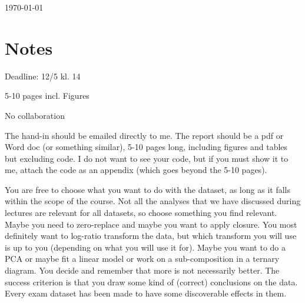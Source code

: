 \documentclass{article}
\begin{document}
\today
\tableofcontents

























\newpage{}

\section{Notes}

Deadline: 12/5 kl. 14

5-10 pages incl. Figures

No collaboration


The hand-in should be emailed directly to me. The report should be a pdf or Word doc (or something similar), 5-10 pages long, including figures and tables but excluding code. I do not want to see your code, but if you must show it to me, attach the code as an appendix (which goes beyond the 5-10 pages).\newline

You are free to choose what you want to do with the dataset, as long as it falls within the scope of the course. Not all the analyses that we have discussed during lectures are relevant for all datasets, so choose something you find relevant. Maybe you need to zero-replace and maybe you want to apply closure. You most definitely want to log-ratio transform the data, but which transform you will use is up to you (depending on what you will use it for). Maybe you want to do a PCA or maybe fit a linear model or work on a sub-composition in a ternary diagram. You decide and remember that more is not necessarily better. The success criterion is that you draw some kind of (correct) conclusions on the data. Every exam dataset has been made to have some discoverable effects in them.   \newline
\end{document}
